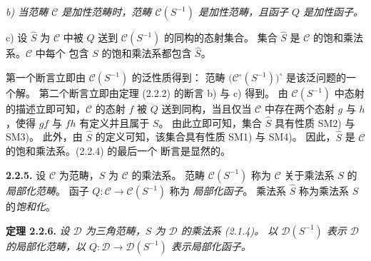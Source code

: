 \clearpage
{}%
\begingroup
\small
\setlength{\emergencystretch}{2em}%
\setlength{\parskip}{0pt}%
\setlength{\abovedisplayskip}{1pt plus 1pt minus 1pt}%
\setlength{\belowdisplayskip}{1pt plus 1pt minus 1pt}%

\begingroup\itshape
{}
\noindent b) 当范畴 $\mathcal C$ 是加性范畴时，范畴
$\mathcal C(S^{-1})$ 是加性范畴，且函子 $Q$ 是加性函子。

\par\noindent c) 设 $\widehat S$ 为 $\mathcal C$ 中被 $Q$ 送到
$\mathcal C(S^{-1})$ 的同构的态射集合。
%
集合 $\widehat S$ 是 $\mathcal C$ 的饱和乘法系。$\mathcal C$ 中每个
包含 $S$ 的饱和乘法系都包含 $\widehat S$。
\endgroup

\par\noindent 第一个断言立即由 $\mathcal C(S^{-1})$ 的泛性质得到：
范畴 $\bigl(\mathcal C^\circ(S^{-1})\bigr)^\circ$ 是该泛问题的一个解。
第二个断言立即由定理 (2.2.2) 的断言 b) 与 c) 得到。
%
由 $\mathcal C(S^{-1})$ 中态射的描述立即可知，$\mathcal C$ 的态射
$f$ 被 $Q$ 送到同构，当且仅当 $\mathcal C$ 中存在两个态射 $g$ 与
$h$，使得 $gf$ 与 $fh$ 有定义并且属于 $S$。
%
由此立即可知，集合 $\widehat S$ 具有性质 SM2) 与 SM3)。
%
此外，由 $\widehat S$ 的定义可知，该集合具有性质 SM1) 与 SM4)。
%
因此，$\widehat S$ 是 $\mathcal C$ 的饱和乘法系。(2.2.4) 的最后一个
断言是显然的。

\smallskip
\noindent\textbf{2.2.5.} 设 $\mathcal C$ 为范畴，$S$ 为
$\mathcal C$ 的乘法系。
%
范畴 $\mathcal C(S^{-1})$ 称为 $\mathcal C$ 关于乘法系 $S$ 的
\emph{局部化范畴}。
%
函子 $Q\colon\mathcal C\longrightarrow\mathcal C(S^{-1})$ 称为
\emph{局部化函子}。
%
乘法系 $\widehat S$ 称为乘法系 $S$ 的\emph{饱和化}。

\smallskip
\noindent\textbf{定理 2.2.6.}\quad
\begingroup\itshape
{}%
设 $\mathcal D$ 为三角范畴，$S$ 为 $\mathcal D$ 的乘法系 (2.1.4)。
以 $\mathcal D(S^{-1})$ 表示 $\mathcal D$ 的局部化范畴，以
$Q\colon\mathcal D\longrightarrow\mathcal D(S^{-1})$ 表示局部化函子。

